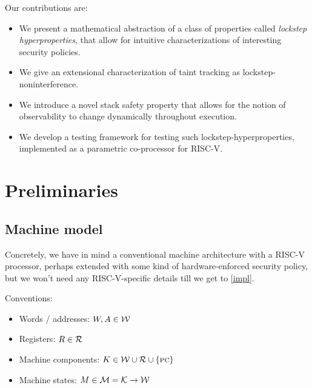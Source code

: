 \documentclass[conference]{IEEEtran}
\begin{document}
Our contributions are:
\begin{itemize}
\item We present a mathematical abstraction of a class of properties
  called {\em lockstep hyperproperties}, that allow for intuitive
  characterizations of interesting security policies.
\item We give an extensional characterization of taint tracking as
  lockstep-noninterference.
\item We introduce a novel stack safety property that allows for
  the notion of observability to change dynamically throughout
  execution.
\item We develop a testing framework for testing such
  lockstep-hyperproperties, implemented as a parametric co-processor
  for RISC-V.
\end{itemize}

\fi

\section{Preliminaries}

\subsection{Machine model}

Concretely, we have in mind a conventional machine architecture with a
RISC-V processor, perhaps extended with some kind of hardware-enforced
security policy, but we won't need any RISC-V-specific details till we get
to \cref{impl}.

Conventions:
%
\begin{itemize}
\item Words / addresses: $W,A \in {\mathcal W}$
\item Registers: $R \in {\mathcal R}$
\item Machine components: $K \in {\mathcal W} \cup {\mathcal R} \cup \{
\textsc{pc} \}$
\item Machine states: $M \in {\mathcal M} = {\mathcal K}\rightarrow{\mathcal W}$
\end{itemize}

\end{document}
